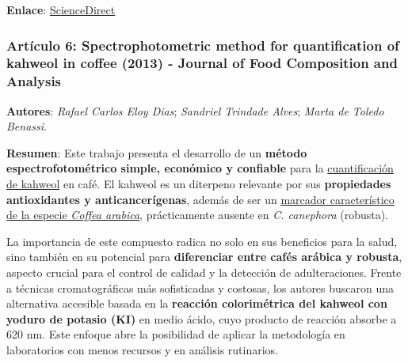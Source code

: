 \documentclass{article}
\begin{document}
\textbf{Enlace}: \href{https://www.sciencedirect.com/science/article/pii/S0924203118300936?casa_token=_33-Sbu47WwAAAAA:Tki6rIVBn4RDjLmxmoK2mIy-pEYqBp-gOmxBx0xvBytvpOjb-TjrKA6h47xbnXTpBKfj6CYoORim}{ScienceDirect} \vspace{0.5cm}


\subsubsection{\textbf{Artículo 6:} \textcolor{bluegray}{\textbf{Spectrophotometric method for quantification of kahweol in coffee (2013) - Journal of Food Composition and Analysis}}} \vspace{0.5cm}

\textbf{Autores}: \textit{Rafael Carlos Eloy Dias}; \textit{Sandriel Trindade Alves}; \textit{Marta de Toledo Benassi}. \vspace{0.5cm}

\textbf{Resumen}: Este trabajo presenta el desarrollo de un \textbf{método espectrofotométrico simple, económico y confiable} para la \underline{cuantificación de kahweol} en café. El kahweol es un diterpeno relevante por sus \textbf{propiedades antioxidantes y anticancerígenas}, además de ser un \underline{marcador característico de la especie \textit{Coffea arabica}}, prácticamente ausente en \textit{C. canephora} (robusta).  

La importancia de este compuesto radica no solo en sus beneficios para la salud, sino también en su potencial para \textbf{diferenciar entre cafés arábica y robusta}, aspecto crucial para el control de calidad y la detección de adulteraciones. Frente a técnicas cromatográficas más sofisticadas y costosas, los autores buscaron una alternativa accesible basada en la \textbf{reacción colorimétrica del kahweol con yoduro de potasio (KI)} en medio ácido, cuyo producto de reacción absorbe a 620 nm. Este enfoque abre la posibilidad de aplicar la metodología en laboratorios con menos recursos y en análisis rutinarios. \vspace{0.5cm}
\end{document}
